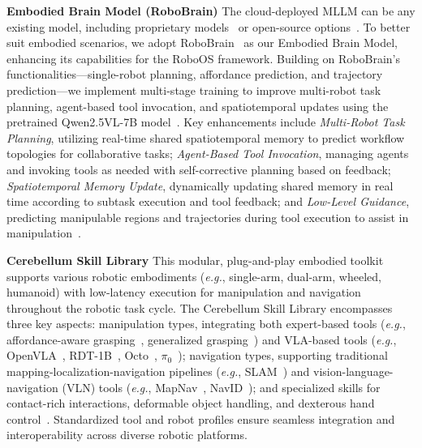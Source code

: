 \textbf{Embodied Brain Model (RoboBrain)} 
The cloud-deployed MLLM can be any existing model, including proprietary models~\cite{hurst2024gpt4o, anthropic2024claude3.5, Google2023gemini} or open-source options~\cite{liu2024deepseek,Qwen2.5-VL,chen2024internvl,li2024llavaov,abdin2024phi,beyer2024paligemma}. To better suit embodied scenarios, we adopt RoboBrain~\cite{ji2025robobrain} as our Embodied Brain Model, enhancing its capabilities for the RoboOS framework. Building on RoboBrain's functionalities—single-robot planning, affordance prediction, and trajectory prediction—we implement multi-stage training to improve multi-robot task planning, agent-based tool invocation, and spatiotemporal updates using the pretrained Qwen2.5VL-7B model~\cite{Qwen2.5-VL}. Key enhancements include \textit{Multi-Robot Task Planning}, utilizing real-time shared spatiotemporal memory to predict workflow topologies for collaborative tasks; \textit{Agent-Based Tool Invocation}, managing agents and invoking tools as needed with self-corrective planning based on feedback; \textit{Spatiotemporal Memory Update}, dynamically updating shared memory in real time according to subtask execution and tool feedback; and \textit{Low-Level Guidance}, predicting manipulable regions and trajectories during tool execution to assist in manipulation~\cite{ji2025robobrain}.

\textbf{Cerebellum Skill Library} 
This modular, plug-and-play embodied toolkit supports various robotic embodiments (\textit{e.g.}, single-arm, dual-arm, wheeled, humanoid) with low-latency execution for manipulation and navigation throughout the robotic task cycle. 
The Cerebellum Skill Library encompasses three key aspects: manipulation types, integrating both expert-based tools (\textit{e.g.}, affordance-aware grasping~\cite{tang2025affordgrasp}, generalized grasping~\cite{fang2023anygrasp}) and VLA-based tools (\textit{e.g.}, OpenVLA~\cite{kim2024openvla}, RDT-1B~\cite{liu2024rdt}, Octo~\cite{team2024octo}, $\pi_0$~\cite{black2024pi_0}); 
navigation types, supporting traditional mapping-localization-navigation pipelines (\textit{e.g.}, SLAM~\cite{xu2025fastliolocalization, grisetti2010tutorial}) and vision-language-navigation (VLN) tools (\textit{e.g.}, MapNav~\cite{zhang2025mapnav}, NavID~\cite{zhang2024navid}); 
and specialized skills for contact-rich interactions, deformable object handling, and dexterous hand control~\cite{fu2025cordvip, zhong2025dexgrasp, aksoy2025planning}. 
Standardized tool and robot profiles ensure seamless integration and interoperability across diverse robotic platforms.

